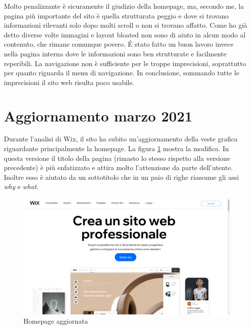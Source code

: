 \documentclass[11pt,a4paper]{article}
\newcommand*{\wix}{Wix}
\begin{document}
Molto penalizzante è sicuramente il giudizio della homepage, ma,
secondo me, la pagina più importante del sito è quella strutturata
peggio e dove si trovano informazioni rilevanti solo dopo molti scroll
o non si trovano affatto. Come ho già detto diverse volte immagini e
layout bloated non sono di aiuto in alcun modo al contenuto, che
rimane comunque povero. \'E stato fatto un buon lavoro invece nella
pagina interna dove le informazioni sono ben strutturate e facilmente
reperibili. La navigazione non è sufficiente per le troppe
imprecisioni, soprattutto per quanto riguarda il menu di
navigazione. In conclusione, sommando tutte le imprecisioni il sito
web risulta poco usabile.

\section{Aggiornamento marzo 2021}

Durante l'analisi di \wix{}, il sito ha subito un'aggiornamento della
veste grafica riguardante principalmente la homepage. La figura
\ref{fig:homepage-updated} mostra la modifica. In questa versione il
titolo della pagina (rimasto lo stesso rispetto alla versione
precedente) è più enfatizzato e attira molto l'attenzione da parte
dell'utente. Inoltre esso è aiutato da un sottotitolo che in un paio
di righe riassume gli assi \textit{why} e \textit{what}.

\begin{figure}[H]
  \centering
  \includegraphics[width=1\textwidth]{img/homepage-updated.png}
  \caption{Homepage aggiornata}
  \label{fig:homepage-updated}
\end{figure}
\end{document}

